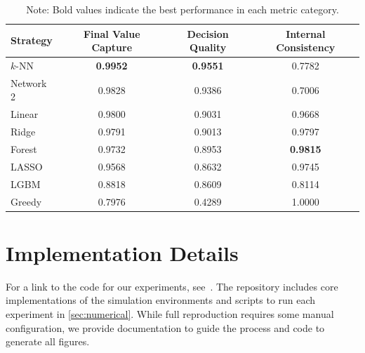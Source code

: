 \documentclass[11pt,reqno,a4paper]{amsart}
\theoremstyle{definition}
\numberwithin{equation}{section}
\DeclareMathOperator{\1}{\mathbbm{1}}
\begin{document}
\begin{table}[htbp]
  \centering
  \caption{Performance Metrics of Different Strategies, HCL Dimension = 50}
  \label{tab:strategy_metrics_dim50}
  \begin{tabular}{lccc}
    \toprule
    \textbf{Strategy} & \textbf{Final Value Capture} & \textbf{Decision Quality} & \textbf{Internal Consistency} \\
    \midrule
    $k$-NN            & \textbf{0.9952}              & \textbf{0.9551}           & 0.7782                        \\
    Network 2         & 0.9828                       & 0.9386                    & 0.7006                        \\
    Linear            & 0.9800                       & 0.9031                    & 0.9668                        \\
    Ridge             & 0.9791                       & 0.9013                    & 0.9797                        \\
    Forest            & 0.9732                       & 0.8953                    & \textbf{0.9815}               \\
    LASSO             & 0.9568                       & 0.8632                    & 0.9745                        \\
    LGBM              & 0.8818                       & 0.8609                    & 0.8114                        \\
    Greedy            & 0.7976                       & 0.4289                    & 1.0000                        \\
    \bottomrule
  \end{tabular}
  \caption*{\small Note: Bold values indicate the best performance in each metric category.}
\end{table}

\clearpage


\section{Implementation Details}\label{app:implementation}
For a link to the code for our experiments, see~\cite{code}. The repository includes core implementations of the simulation environments and scripts to run each experiment in \cref{sec:numerical}. While full reproduction requires some manual configuration, we provide documentation to guide the process and code to generate all figures.
\end{document}
